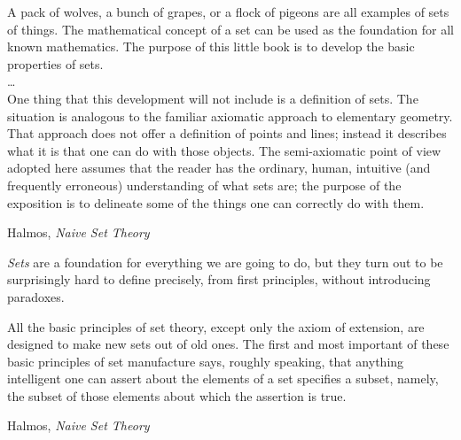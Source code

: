 \setcounter{currentlevel}{\value{baseSectionLevel}}
\epigraph{A pack of wolves, a bunch of grapes, or a flock of
pigeons are all examples of sets of things.
The mathematical concept of a set can be used as the foundation
for all known mathematics.
The purpose of this little book is to develop the basic properties
of sets.\\
\ldots \\
One thing that this development will not include is a definition
of sets.
The situation is analogous to the familiar axiomatic approach to
elementary geometry.
That approach does not offer a definition of points and lines;
instead it describes what it is that one can do with those
objects.
The semi-axiomatic point of view adopted here assumes that the
reader has the ordinary, human, intuitive (and frequently
erroneous) understanding of what sets are; the purpose of the
exposition is to delineate some of the things one can correctly do
with them.}%
{Halmos, \textit{Naive Set Theory}\cite{Halmos1960Naive}}

\vfill

\emph{Sets} are a foundation for everything we are going to do,
but they turn out to be surprisingly hard to define precisely,
from first principles, without introducing paradoxes.

\vfill

\label{sec:math-sets}
\lstset{language=Clojure}

\cite{ferreiros2007labyrinth,sep-dedekind-foundations}

\epigraph{All the basic principles of set theory, except only the
axiom of extension, are designed to make new sets out of old ones.
The first and most important of these basic principles of set
manufacture says, roughly speaking, that anything intelligent one
can assert about the elements of a set specifies a subset, namely,
the subset of those elements about which the assertion is true.}
{Halmos, \textit{Naive Set Theory}~\cite[section~2]{Halmos1960Naive}}


